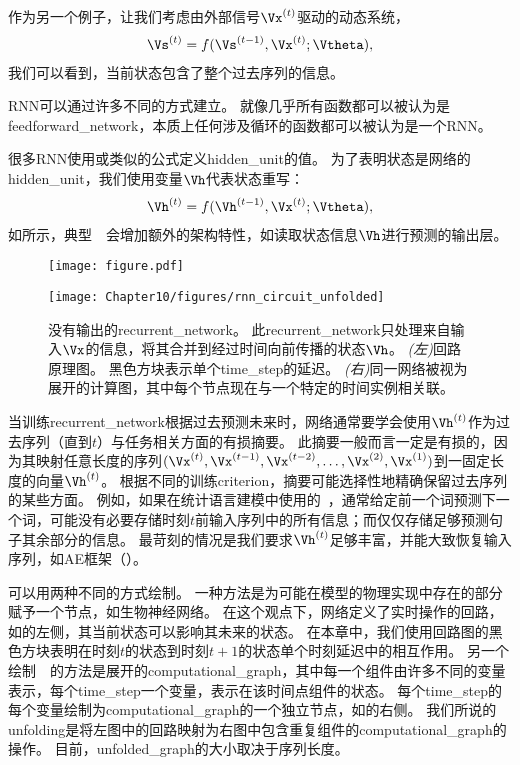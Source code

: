 
作为另一个例子，让我们考虑由外部信号$\Vx^{(t)}$驱动的动态系统，
\begin{align}
 \label{eq:104s}
 \Vs^{(t)} = f(\Vs^{(t-1)}, \Vx^{(t)} ; \Vtheta),
\end{align}
我们可以看到，当前状态包含了整个过去序列的信息。

\gls{RNN}可以通过许多不同的方式建立。
就像几乎所有函数都可以被认为是\gls{feedforward_network}，本质上任何涉及循环的函数都可以被认为是一个\gls{RNN}。

很多\gls{RNN}使用或类似的公式定义\gls{hidden_unit}的值。
为了表明状态是网络的\gls{hidden_unit}，我们使用变量$\Vh$代表状态重写：
\begin{align}
 \label{eq:105h}
 \Vh^{(t)} = f(\Vh^{(t-1)}, \Vx^{(t)} ; \Vtheta),
\end{align}
如所示，典型~~会增加额外的架构特性，如读取状态信息$\Vh$进行预测的输出层。
\begin{figure}[!htb]
\ifOpenSource
\centerline{\texttt{[image: figure.pdf]}}
\else
\centerline{\texttt{[image: Chapter10/figures/rnn\_circuit\_unfolded]}}
\fi
\caption{没有输出的\gls{recurrent_network}。
此\gls{recurrent_network}只处理来自输入$\Vx$的信息，将其合并到经过时间向前传播的状态$\Vh$。
\emph{(左)}回路原理图。 黑色方块表示单个\gls{time_step}的延迟。
\emph{(右)}同一网络被视为展开的计算图，其中每个节点现在与一个特定的时间实例相关联。
}
\label{fig:chap10_rnn_circuit_unfolded}
\end{figure}

当训练\gls{recurrent_network}根据过去预测未来时，网络通常要学会使用$\Vh^{(t)}$作为过去序列（直到$t$）与任务相关方面的有损摘要。
此摘要一般而言一定是有损的，因为其映射任意长度的序列$(\Vx^{(t)},\Vx^{(t-1)}, \Vx^{(t-2)},\dots,\Vx^{(2)}, \Vx^{(1)})$到一固定长度的向量$\Vh^{(t)}$。
根据不同的训练\gls{criterion}，摘要可能选择性地精确保留过去序列的某些方面。
例如，如果在统计语言建模中使用的~，通常给定前一个词预测下一个词，可能没有必要存储时刻$t$前输入序列中的所有信息；而仅仅存储足够预测句子其余部分的信息。
最苛刻的情况是我们要求$\Vh^{(t)}$足够丰富，并能大致恢复输入序列，如\gls{AE}框架（）。


可以用两种不同的方式绘制。
一种方法是为可能在模型的物理实现中存在的部分赋予一个节点，如生物神经网络。
在这个观点下，网络定义了实时操作的回路，如的左侧，其当前状态可以影响其未来的状态。
在本章中，我们使用回路图的黑色方块表明在时刻$t$的状态到时刻$t+1$的状态单个时刻延迟中的相互作用。
另一个绘制~~的方法是展开的\gls{computational_graph}，其中每一个组件由许多不同的变量表示，每个\gls{time_step}一个变量，表示在该时间点组件的状态。
每个\gls{time_step}的每个变量绘制为\gls{computational_graph}的一个独立节点，如的右侧。
我们所说的\gls{unfolding}是将左图中的回路映射为右图中包含重复组件的\gls{computational_graph}的操作。
目前，\gls{unfolded_graph}的大小取决于序列长度。

